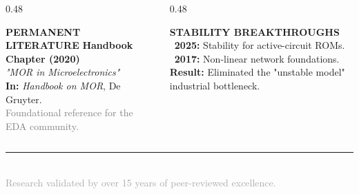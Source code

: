 \begin{frame}[t]{\insertsectionhead}
	\begin{columns}[t, onlytextwidth]

		\begin{column}{0.48\textwidth}
			\begin{block}{\small \textbf{PERMANENT LITERATURE}}
				\vspace{0.5ex}
				\small
				\textbf{\textcolor{blue!80!black}{Handbook Chapter (2020)}} \\
				\textit{"MOR in Microelectronics"} \\
				\textbf{In:} \textit{Handbook on MOR}, De Gruyter. \\
				\textcolor{gray}{Foundational reference for the EDA community.}
			\end{block}
		\end{column}

		\begin{column}{0.48\textwidth}
			\begin{exampleblock}{\small \textbf{STABILITY BREAKTHROUGHS}}
				\vspace{0.5ex}
				\small
				\textbullet~\textbf{2025:} Stability for active-circuit ROMs.\\
				\textbullet~\textbf{2017:} Non-linear network foundations.\\
				\textcolor{red!80!black}{\textbf{Result:}} Eliminated the "unstable model" industrial bottleneck.
			\end{exampleblock}
		\end{column}

	\end{columns}

	\vfill
	\centering
	\textcolor{gray!50}{\rule{0.6\textwidth}{0.4pt}} \\
	\small \textcolor{darkgray}{Research validated by over 15 years of peer-reviewed excellence.}
\end{frame}

